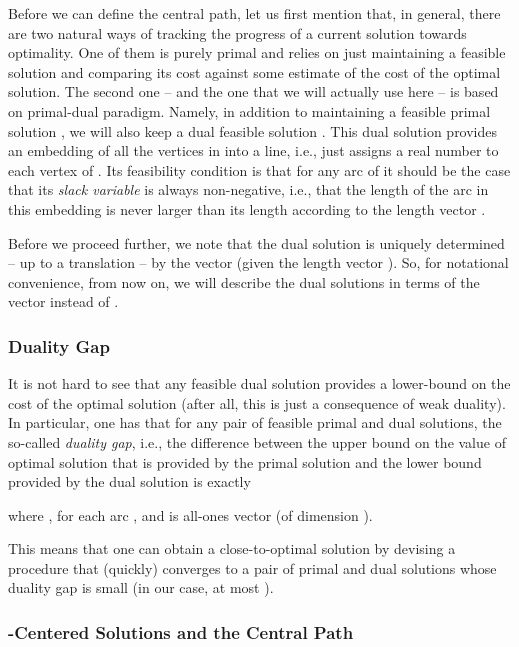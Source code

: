 \documentclass[11pt, letterpaper]{article}
\begin{document}
Before we can define the central path, let us first mention that, in general, there are two natural ways of tracking the progress of a current solution towards optimality. One of them is purely primal and relies on just maintaining a feasible solution  and comparing its cost against some estimate of the cost of the optimal solution. The second one -- and the one that we will actually use here -- is based on primal-dual paradigm. Namely, in addition to maintaining a feasible primal solution , we will also keep a dual feasible solution . This dual solution provides an embedding of all the vertices in  into a line, i.e.,  just assigns a real number  to each vertex  of . Its feasibility condition is that for any arc  of  it should be the case that its {\em slack variable}  is always non-negative, i.e., that the length of the arc  in this embedding is never larger than its length according to the length vector . 

Before we proceed further, we note that the dual solution  is uniquely determined -- up to a translation -- by the vector  (given the length vector ). So, for notational convenience, from now on, we will describe the dual solutions in terms of the vector  instead of .

\subsubsection*{Duality Gap}

It is not hard to see that any feasible dual solution  provides a lower-bound on the cost of the optimal solution (after all, this is just a consequence of weak duality). In particular, one has that for any pair  of feasible primal and dual solutions, the so-called {\em duality gap}, i.e., the difference between the upper bound on the value of optimal solution that is provided by the primal solution  and the lower bound provided by the dual solution  is exactly 

where , for each arc , and  is all-ones vector (of dimension ). 

This means that one can obtain a close-to-optimal solution by devising a procedure that (quickly) converges to a pair of primal and dual solutions  whose duality gap  is small (in our case, at most ). 



\subsubsection*{-Centered Solutions and the Central Path}
\end{document}
